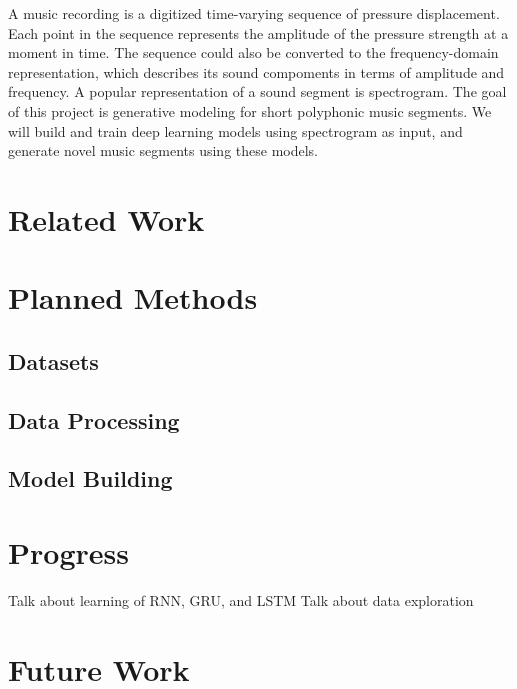 \documentclass[sigconf,authorversion]{acmart}
\begin{document}
A music recording is a digitized time-varying sequence of pressure displacement. Each point in the 
sequence represents the amplitude of the pressure strength at a moment in time. The sequence could 
also be converted to the frequency-domain representation, which describes its sound compoments in terms 
of amplitude and frequency. A popular representation of a sound segment is spectrogram. The goal of this 
project is generative modeling for short polyphonic music segments. We will build and train deep learning 
models using spectrogram as input, and generate novel music segments using these models.

\section{Related Work}



\section{Planned Methods}

\subsection{Datasets}


\subsection{Data Processing}


\subsection{Model Building}

\section{Progress}
Talk about learning of RNN, GRU, and LSTM
Talk about data exploration

\section{Future Work}



\end{document}
